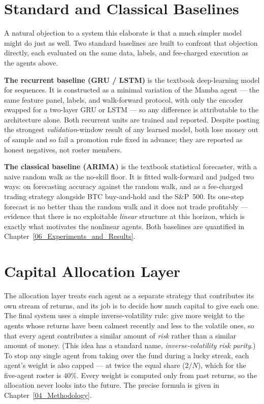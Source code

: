 \section{Standard and Classical Baselines}
\label{sec:baselines_arch}

A natural objection to a system this elaborate is that a much simpler model might do just as well. Two standard baselines are built to confront that objection directly, each evaluated on the same data, labels, and fee-charged execution as the agents above.


\textbf{The recurrent baseline (GRU / LSTM)} is the textbook deep-learning model for sequences. It is constructed as a minimal variation of the Mamba agent --- the same feature panel, labels, and walk-forward protocol, with only the encoder swapped for a two-layer GRU or LSTM --- so any difference is attributable to the architecture alone. Both recurrent units are trained and reported. Despite posting the strongest \textit{validation}-window result of any learned model, both lose money out of sample and so fail a promotion rule fixed in advance; they are reported as honest negatives, not roster members.


\textbf{The classical baseline (ARIMA)} is the textbook statistical forecaster, with a naive random walk as the no-skill floor. It is fitted walk-forward and judged two ways: on forecasting accuracy against the random walk, and as a fee-charged trading strategy alongside BTC buy-and-hold and the S\&P~500. Its one-step forecast is no better than the random walk and it does not trade profitably --- evidence that there is no exploitable \textit{linear} structure at this horizon, which is exactly what motivates the nonlinear agents. Both baselines are quantified in Chapter~\ref{06_Experiments_and_Results}.

\section{Capital Allocation Layer}
\label{sec:supervisory_agent_arch}

The allocation layer treats each agent as a separate strategy that contributes its own stream of returns, and its job is to decide how much capital to give each one. The final system uses a simple inverse-volatility rule: give more weight to the agents whose returns have been calmest recently and less to the volatile ones, so that every agent contributes a similar amount of \textit{risk} rather than a similar amount of money. (This idea has a standard name, \textit{inverse-volatility risk parity}.) To stop any single agent from taking over the fund during a lucky streak, each agent's weight is also capped --- at twice the equal share ($2/N$), which for the five-agent roster is $40\%$. Every weight is computed only from past returns, so the allocation never looks into the future. The precise formula is given in Chapter~\ref{04_Methodology}.


